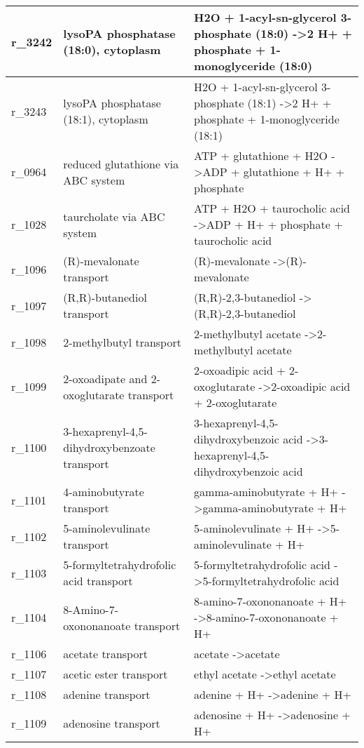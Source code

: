\begin{landscape}
{\begin{longtable}{|l|p{7cm}|p{15cm}|}
r\_3242 & lysoPA phosphatase (18:0), cytoplasm & H2O + 1-acyl-sn-glycerol 3-phosphate (18:0)  -\textgreater 2 H+ + phosphate + 1-monoglyceride (18:0) \\ \hline
r\_3243 & lysoPA phosphatase (18:1), cytoplasm & H2O + 1-acyl-sn-glycerol 3-phosphate (18:1)  -\textgreater 2 H+ + phosphate + 1-monoglyceride (18:1) \\ \hline
r\_0964 & reduced glutathione via ABC system & ATP + glutathione + H2O  -\textgreater ADP + glutathione + H+ + phosphate \\ \hline
r\_1028 & taurcholate via ABC system & ATP + H2O + taurocholic acid  -\textgreater ADP + H+ + phosphate + taurocholic acid \\ \hline
r\_1096 & (R)-mevalonate transport & (R)-mevalonate  -\textgreater (R)-mevalonate \\ \hline
r\_1097 & (R,R)-butanediol transport & (R,R)-2,3-butanediol  -\textgreater (R,R)-2,3-butanediol \\ \hline
r\_1098 & 2-methylbutyl transport & 2-methylbutyl acetate  -\textgreater 2-methylbutyl acetate \\ \hline
r\_1099 & 2-oxoadipate and 2-oxoglutarate transport & 2-oxoadipic acid + 2-oxoglutarate  -\textgreater 2-oxoadipic acid + 2-oxoglutarate \\ \hline
r\_1100 & 3-hexaprenyl-4,5-dihydroxybenzoate transport & 3-hexaprenyl-4,5-dihydroxybenzoic acid  -\textgreater 3-hexaprenyl-4,5-dihydroxybenzoic acid \\ \hline
r\_1101 & 4-aminobutyrate transport & gamma-aminobutyrate + H+  -\textgreater gamma-aminobutyrate + H+ \\ \hline
r\_1102 & 5-aminolevulinate transport & 5-aminolevulinate + H+  -\textgreater 5-aminolevulinate + H+ \\ \hline
r\_1103 & 5-formyltetrahydrofolic acid transport & 5-formyltetrahydrofolic acid  -\textgreater 5-formyltetrahydrofolic acid \\ \hline
r\_1104 & 8-Amino-7-oxononanoate transport & 8-amino-7-oxononanoate + H+  -\textgreater 8-amino-7-oxononanoate + H+ \\ \hline
r\_1106 & acetate transport & acetate  -\textgreater acetate \\ \hline
r\_1107 & acetic ester transport & ethyl acetate  -\textgreater ethyl acetate \\ \hline
r\_1108 & adenine transport & adenine + H+  -\textgreater adenine + H+ \\ \hline
r\_1109 & adenosine transport & adenosine + H+  -\textgreater adenosine + H+ \\ \hline

\end{longtable}}
\end{landscape}
